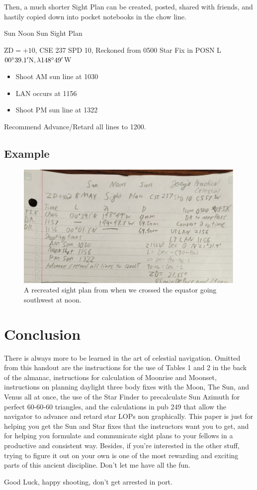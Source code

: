 \documentclass{article}
\begin{document}
Then, a much shorter Sight Plan can be created, posted, shared with friends, and hastily copied down into pocket notebooks in the chow line.
\begin{tcolorbox}
\begin{center}
    Sun Noon Sun Sight Plan
    
ZD$=+10$, CSE 237 SPD 10, Reckoned from 0500 Star Fix in POSN L$00\degree39.1'\text{N},\lambda148\degree49'$W
\begin{itemize}
    \item Shoot AM sun line at 1030
    \item LAN occurs at 1156
    \item Shoot PM sun line at 1322
\end{itemize}
Recommend Advance/Retard all lines to 1200.
\end{center}
\end{tcolorbox}
\pagebreak
\subsection{Example}
\begin{figure}[h]
    \centering
    \includegraphics[width=1\linewidth]{IMG20240206151605~3.jpg}
    \caption{A recreated sight plan from when we crossed the equator going southwest at noon.}
\end{figure}
\section*{Conclusion}
There is always more to be learned in the art of celestial navigation. Omitted from this handout are the instructions for the use of Tables 1 and 2 in the back of the almanac, instructions for calculation of Moonrise and Moonset, instructions on planning daylight three body fixes with the Moon, The Sun, and Venus all at once, the use of the Star Finder to precalculate Sun Azimuth for perfect 60-60-60 triangles, and the calculations in pub 249 that allow the navigator to advance and retard star LOPs non graphically. This paper is just for helping you get the Sun and Star fixes that the instructors want you to get, and for helping you formulate and communicate sight plans to your fellows in a productive and consistent way. Besides, if you're interested in the other stuff, trying to figure it out on your own is one of the most rewarding and exciting parts of this ancient discipline. Don't let me have all the fun.

\begin{center}
    Good Luck, happy shooting, don't get arrested in port.
\end{center}
\end{document}
